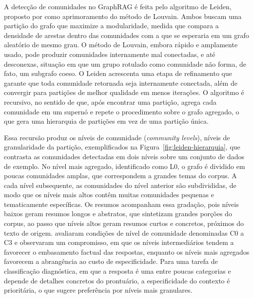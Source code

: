 A detecção de comunidades no GraphRAG é feita pelo algoritmo de Leiden, proposto por \citet{traag2019} como aprimoramento do método de Louvain. Ambos buscam uma partição do grafo que maximize a modularidade, medida que compara a densidade de arestas dentro das comunidades com a que se esperaria em um grafo aleatório de mesmo grau. O método de Louvain, embora rápido e amplamente usado, pode produzir comunidades internamente mal conectadas, e até desconexas, situação em que um grupo rotulado como comunidade não forma, de fato, um subgrafo coeso. O Leiden acrescenta uma etapa de refinamento que garante que toda comunidade retornada seja internamente conectada, além de convergir para partições de melhor qualidade em menos iterações. O algoritmo é recursivo, no sentido de que, após encontrar uma partição, agrega cada comunidade em um supernó e repete o procedimento sobre o grafo agregado, o que gera uma hierarquia de partições em vez de uma partição única.

Essa recursão produz os níveis de comunidade (\textit{community levels}), níveis de granularidade da partição, exemplificados na Figura~\ref{fig:leiden-hierarquia}, que contrasta as comunidades detectadas em dois níveis sobre um conjunto de dados de exemplo. No nível mais agregado, identificado como L0, o grafo é dividido em poucas comunidades amplas, que correspondem a grandes temas do corpus. A cada nível subsequente, as comunidades do nível anterior são subdivididas, de modo que os níveis mais altos contêm muitas comunidades pequenas e tematicamente específicas. Os resumos acompanham essa gradação, pois níveis baixos geram resumos longos e abstratos, que sintetizam grandes porções do corpus, ao passo que níveis altos geram resumos curtos e concretos, próximos do texto de origem. \citet{edge2024} avaliaram condições de nível de comunidade denominadas C0 a C3 e observaram um compromisso, em que os níveis intermediários tendem a favorecer o embasamento factual das respostas, enquanto os níveis mais agregados favorecem a abrangência ao custo de especificidade. Para uma tarefa de classificação diagnóstica, em que a resposta é uma entre poucas categorias e depende de detalhes concretos do prontuário, a especificidade do contexto é prioritária, o que sugere preferência por níveis mais granulares.

